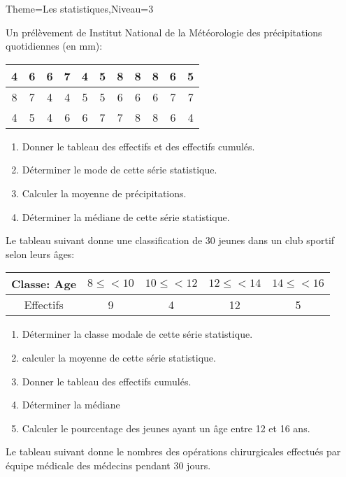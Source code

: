 \documentclass[a4paper,12pt]{article}
\begin{document}
\begin{Maquette}[Fiche]{Theme=Les statistiques,Niveau=3}

\begin{exercice}
Un prélèvement de Institut National de la Météorologie des précipitations quotidiennes (en mm):

\begin{tabular}{c|c|c|c|c|c|c|c|c|c|c}
4 & 6 & 6 & 7 & 4 & 5 & 8 & 8 & 8 & 6 & 5 \\ 
\hline 
8 & 7 & 4 & 4 & 5 & 5 & 6 & 6 & 6 & 7 & 7 \\ 
\hline 
4 & 5 & 4 & 6 & 6 & 7 & 7 & 8 & 8 & 6 & 4 \\ 
\end{tabular} 
\begin{enumerate}
\item Donner le tableau des effectifs et des effectifs cumulés.
\item Déterminer le mode de cette série statistique.
\item Calculer la moyenne de précipitations.
\item Déterminer la médiane de cette série statistique.
\end{enumerate}
\end{exercice}

\begin{exercice}
Le tableau suivant donne une classification de 30 jeunes dans un club sportif selon leurs âges:

\begin{tabular}{|c|c|c|c|c|}
\hline 
Classe: Age & $8\leq <10$ & $10\leq <12$ & $12\leq <14$ & $14\leq <16$ \\ 
\hline 
Effectifs & 9 & 4 & 12 & 5 \\ 
\hline 
\end{tabular}
\begin{enumerate}
\item Déterminer la classe modale de cette série statistique.
\item calculer la moyenne de cette série statistique.
\item Donner le tableau des effectifs cumulés.
\item Déterminer la médiane
\item Calculer le pourcentage des jeunes ayant un âge entre 12 et 16 ans.
\end{enumerate}
\end{exercice}

\begin{exercice}
Le tableau suivant donne le nombres des opérations chirurgicales effectués par équipe médicale des médecins pendant 30 jours.


\end{exercice}
\end{Maquette}
\end{document}
